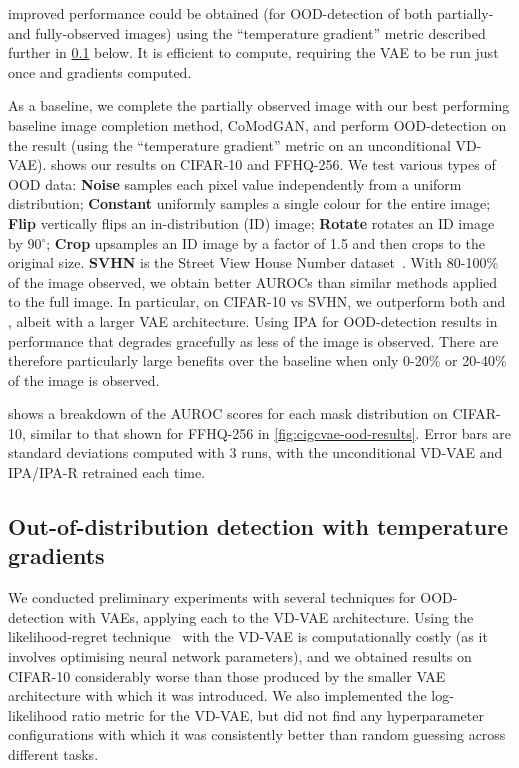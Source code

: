 improved performance could be obtained (for OOD-detection of both partially- and
fully-observed images) using the ``temperature gradient'' metric described
further in \cref{supp:cigcvae-temp-grad} below.
%
It is efficient to compute, requiring the VAE to be run just once and gradients
computed.

As a baseline, we complete the partially observed image with our best performing
baseline image completion method, CoModGAN, and perform OOD-detection on the
result (using the ``temperature gradient'' metric on an unconditional VD-VAE).
 shows our results on CIFAR-10 and FFHQ-256. We test
various types of OOD data: \textbf{Noise} samples each pixel value independently
from a uniform distribution; \textbf{Constant} uniformly samples a single colour
for the entire image; \textbf{Flip} vertically flips an in-distribution (ID)
image; \textbf{Rotate} rotates an ID image by 90$^{\circ}$; \textbf{Crop}
upsamples an ID image by a factor of 1.5 and then crops to the original size.
\textbf{SVHN} is the Street View House Number dataset~\citep{netzer2011reading}.
With 80-100\% of the image observed, we obtain better AUROCs than similar
methods applied to the full image. In particular, on CIFAR-10 vs SVHN, we
outperform both \citet{xiao2020likelihood} and \citet{havtorn2021hierarchical},
albeit with a larger VAE architecture. Using IPA for OOD-detection results in
performance that degrades gracefully as less of the image is observed. There are
therefore particularly large benefits over the baseline when only 0-20\% or
20-40\% of the image is observed.

 shows a breakdown of the AUROC scores for each mask
distribution on CIFAR-10, similar to that shown for FFHQ-256 in
\cref{fig:cigcvae-ood-results}. Error bars are standard deviations computed with 3 runs,
with the unconditional VD-VAE and IPA/IPA-R retrained each time.



\subsection{Out-of-distribution detection with temperature gradients} \label{supp:cigcvae-temp-grad}


We conducted preliminary experiments with several techniques for OOD-detection
with VAEs, applying each to the VD-VAE architecture. Using the likelihood-regret
technique~\citep{xiao2020likelihood} with the VD-VAE is computationally costly
(as it involves optimising neural network parameters), and we obtained results
on CIFAR-10 considerably worse than those produced by the smaller VAE
architecture with which it was introduced. We also implemented the
log-likelihood ratio metric \citep{havtorn2021hierarchical} for the VD-VAE, but
did not find any hyperparameter configurations with which it was consistently
better than random guessing across different tasks.

